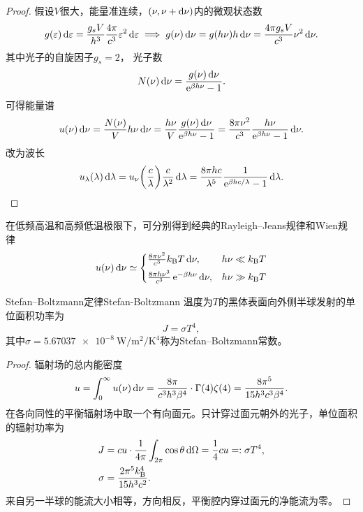 \begin{proof}
	假设$V$很大，能量准连续，$(\nu,\nu + \mathop{}\!\mathrm{d}\nu)$内的微观状态数
	\[
		g(\varepsilon)\mathop{}\!\mathrm{d}\varepsilon = \frac{g_sV}{h^3}\frac{4\pi}{c^3}\varepsilon^2\mathop{}\!\mathrm{d}\varepsilon \implies g(\nu)\mathop{}\!\mathrm{d}\nu = g(h\nu)h\mathop{}\!\mathrm{d}\nu = \frac{4\pi g_sV}{c^3}\nu^2\mathop{}\!\mathrm{d}\nu.
	\]
	其中光子的自旋因子$g_s = 2$，
	光子数
	\[
		N(\nu)\mathop{}\!\mathrm{d}\nu = \frac{g(\nu)\mathop{}\!\mathrm{d}\nu}{\mathop{}\!\mathrm{e}^{\beta h\nu} - 1}.
	\]
	可得能量谱
	\[
		u(\nu)\mathop{}\!\mathrm{d}\nu = \frac{N(\nu)}Vh\nu\mathop{}\!\mathrm{d}\nu = \frac{h\nu}V\frac{g(\nu)\mathop{}\!\mathrm{d}\nu}{\mathop{}\!\mathrm{e}^{\beta h\nu} - 1} = \frac{8\pi\nu^2}{c^3}\frac{h\nu}{\mathop{}\!\mathrm{e}^{\beta h\nu} - 1}\mathop{}\!\mathrm{d}\nu.
	\]
	改为波长
	\[
		u_\lambda(\lambda)\mathop{}\!\mathrm{d}\lambda = u_\nu\biggl(\frac c\lambda\biggr)\frac c{\lambda^2}\mathop{}\!\mathrm{d}\lambda = \frac{8\pi hc}{\lambda^5}\frac1{\mathop{}\!\mathrm{e}^{\beta hc/\lambda} - 1}\mathop{}\!\mathrm{d}\lambda.
		\qedhere
	\]
\end{proof}

\begin{corollary}
	在低频高温和高频低温极限下，可分别得到经典的Rayleigh--Jeans规律和Wien规律
	\begin{equation}
		\label{eq:sm-planck-spectrum-limits}
		u(\nu)\mathop{}\!\mathrm{d}\nu \simeq
		\begin{cases}
			\frac{8\pi\nu^2}{c^3}k_{\mathrm{B}} T\mathop{}\!\mathrm{d}\nu,&h\nu \ll k_{\mathrm{B}} T\\[1ex]
			\frac{8\pi h\nu^3}{c^3}\mathop{}\!\mathrm{e}^{-\beta h\nu}\mathop{}\!\mathrm{d}\nu,&h\nu \gg k_{\mathrm{B}} T
		\end{cases}
	\end{equation}
\end{corollary}

\begin{theorem}
	{Stefan--Boltzmann定律}{Stefan-Boltzmann}
	温度为$T$的黑体表面向外侧半球发射的单位面积功率为
	\begin{equation}
		J = \sigma T^4,
	\end{equation}
	其中$\sigma = \qty{5.67037e-8}{\watt\per\metre\squared\per\kelvin\tothe{4}}$称为Stefan--Boltzmann常数。
\end{theorem}

\begin{proof}
	辐射场的总内能密度
	\[
		u = \int_0^\infty u(\nu)\mathop{}\!\mathrm{d}\nu = \frac{8\pi}{c^3h^3\beta^4} \cdot \Gamma(4)\zeta(4) = \frac{8\pi^5}{15h^3c^3\beta^4}.
	\]
	在各向同性的平衡辐射场中取一个有向面元。只计穿过面元朝外的光子，单位面积的辐射功率为
	\begin{align*}
		J &= cu \cdot \frac1{4\pi}\int_{2\pi}\cos\theta\mathop{}\!\mathrm{d}\Omega
		= \frac14cu =: \sigma T^4,\\
		\sigma &= \frac{2\pi^5k_{\mathrm{B}}^4}{15h^3c^2}.
	\end{align*}
	来自另一半球的能流大小相等，方向相反，平衡腔内穿过面元的净能流为零。
\end{proof}

